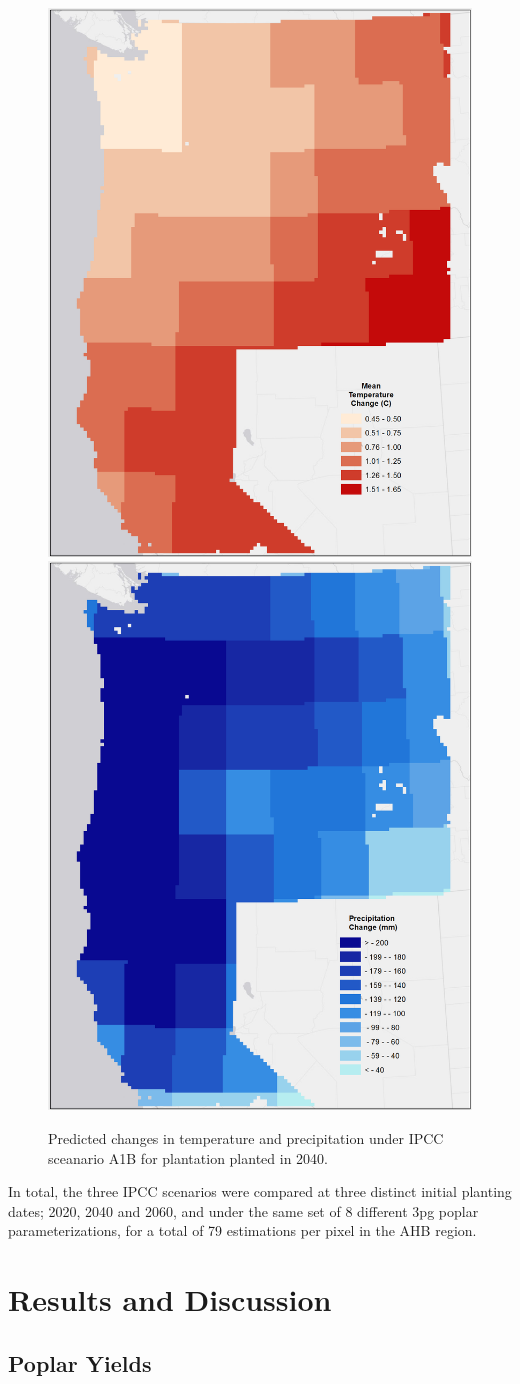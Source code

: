 \documentclass[preprint,12pt]{elsarticle}
\begin{document}
\begin{figure}[hp]
  \centering
  \includegraphics[width=0.45\linewidth]{temp_change}
  \includegraphics[width=0.45\linewidth]{precip_change.png}
  \caption{Predicted changes in temperature and precipitation under \ac{IPCC} sceanario A1B for plantation planted in 2040.}
  \label{fig:change}
\end{figure}

In total, the three \ac{IPCC} scenarios were compared at three
distinct initial planting dates; 2020, 2040 and 2060, and under the
same set of 8 different \ac{3pg} poplar parameterizations, for a total
of 79 estimations per pixel in the \ac{AHB} region.  

\section{Results and Discussion}

\subsection{Poplar Yields}
\label{sec:yield}
\end{document}
